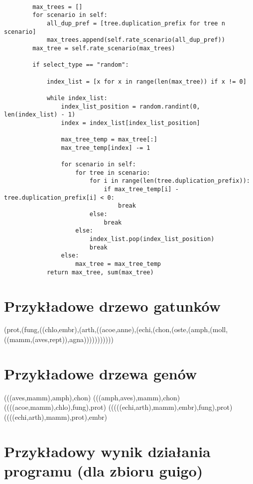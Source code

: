 \documentclass[licencjacka]{pracamgr}
\begin{document}
\begin{verbatim}

		max_trees = []
        for scenario in self:
            all_dup_pref = [tree.duplication_prefix for tree n scenario]
            max_trees.append(self.rate_scenario(all_dup_pref))
        max_tree = self.rate_scenario(max_trees)

        if select_type == "random":

            index_list = [x for x in range(len(max_tree)) if x != 0]

            while index_list:
                index_list_position = random.randint(0, len(index_list) - 1)
                index = index_list[index_list_position]

                max_tree_temp = max_tree[:]
                max_tree_temp[index] -= 1

                for scenario in self:
                    for tree in scenario:
                        for i in range(len(tree.duplication_prefix)):
                            if max_tree_temp[i] - tree.duplication_prefix[i] < 0:
                                break
                        else:
                            break
                    else:
                        index_list.pop(index_list_position)
                        break
                else:
                    max_tree = max_tree_temp
            return max_tree, sum(max_tree)
\end{verbatim}

\chapter{Przykładowe drzewo gatunków}

\begin{center}
(prot,(fung,((chlo,embr),(arth,((acoe,anne),(echi,(chon,(oste,(amph,(moll,((mamm,(aves,rept)),agna)))))))))))
\end{center}

\chapter{Przykładowe drzewa genów}

{\obeylines %

(((aves,mamm),amph),chon)
(((amph,aves),mamm),chon)
((((acoe,mamm),chlo),fung),prot)
(((((echi,arth),mamm),embr),fung),prot)
((((echi,arth),mamm),prot),embr)
}



\chapter{Przykładowy wynik działania programu
    (dla zbioru guigo)}
\end{document}
